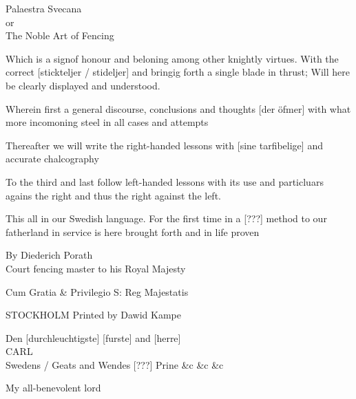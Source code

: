 \cleartoleftpage


\newpage

Palaestra Svecana \\
or \\
The Noble Art of Fencing

Which is a signof honour and beloning among other knightly virtues. With the correct [stickteljer / stideljer] and bringig forth a single blade in thrust; Will here be clearly displayed and understood.

Wherein first a general discourse, conclusions and thoughts [der öfmer] with what more incomoning steel in all cases and attempts

Thereafter we will write the right-handed lessons with [sine tarfibelige] and accurate chalcography

To the third and last follow left-handed lessons with its use and particluars agains the right and thus the right against the left.

This all in our Swedish language. For the first time in a [???] method to our fatherland in service is here brought forth and in life proven

By Diederich Porath \\
Court fencing master to his Royal Majesty

Cum Gratia \& Privilegio S: Reg Majestatis

STOCKHOLM Printed by Dawid Kampe

\newpage 


\newpage

Den [durchleuchtigste] [furste] and [herre] \\
CARL \\
Swedens / Geats and Wendes [???] Prine \&c \&c \&c

My all-benevolent lord

\newpage
